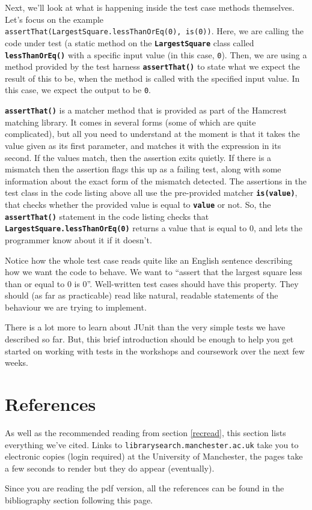 \documentclass[
]{book}
\begin{document}
Next, we'll look at what is happening inside the test case methods themselves. Let's focus on the example \texttt{assertThat(LargestSquare.lessThanOrEq(0),\ is(0))}. Here, we are calling the code under test (a static method on the \textbf{\texttt{LargestSquare}} class called \textbf{\texttt{lessThanOrEq()}} with a specific input value (in this case, \texttt{0}). Then, we are using a method provided by the test harness \textbf{\texttt{assertThat()}} to state what we expect the result of this to be, when the method is called with the specified input value. In this case, we expect the output to be \texttt{0}.

\textbf{\texttt{assertThat()}} is a matcher method that is provided as part of the Hamcrest matching library. It comes in several forms (some of which are quite complicated), but all you need to understand at the moment is that it takes the value given as its first parameter, and matches it with the expression in its second. If the values match, then the assertion exits quietly. If there is a mismatch then the assertion flags this up as a failing test, along with some information about the exact form of the mismatch detected. The assertions in the test class in the code listing above all use the pre-provided matcher \textbf{\texttt{is(value)}}, that checks whether the provided value is equal to \textbf{\texttt{value}} or not. So, the \textbf{\texttt{assertThat()}} statement in the code listing checks that \textbf{\texttt{LargestSquare.lessThanOrEq(0)}} returns a value that is equal to 0, and lets the programmer know about it if it doesn't.

Notice how the whole test case reads quite like an English sentence describing how we want the code to behave. We want to ``assert that the largest square less than or equal to 0 is 0''. Well-written test cases should have this property. They should (as far as practicable) read like natural, readable statements of the behaviour we are trying to implement.

There is a lot more to learn about JUnit than the very simple tests we have described so far. But, this brief introduction should be enough to help you get started on working with tests in the workshops and coursework over the next few weeks.

\hypertarget{reading}{%
\chapter{References}\label{reading}}

As well as the recommended reading from section \ref{recread}, this section lists everything we've cited. Links to \texttt{librarysearch.manchester.ac.uk} take you to electronic copies (login required) at the University of Manchester, the pages take a few seconds to render but they do appear (eventually).

Since you are reading the pdf version, all the references can be found in the bibliography section following this page.

  
\end{document}
